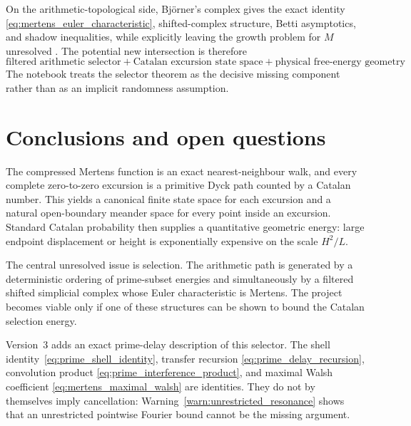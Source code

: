 \documentclass[11pt]{amsart}
\numberwithin{equation}{section}
\theoremstyle{plain}
\theoremstyle{definition}
\theoremstyle{remark}
\newcommand{\Mert}{M}
\begin{document}
On the arithmetic-topological side, Bj\"orner's complex gives the exact identity \eqref{eq:mertens_euler_characteristic}, shifted-complex structure, Betti asymptotics, and shadow inequalities, while explicitly leaving the growth problem for $\Mert$ unresolved \cite{Bjorner2011}.  The potential new intersection is therefore
\begin{equation}
\boxed{
\text{filtered arithmetic selector}
+
\text{Catalan excursion state space}
+
\text{physical free-energy geometry}
}.
\label{eq:literature_intersection}
\end{equation}
The notebook treats the selector theorem as the decisive missing component rather than as an implicit randomness assumption.

\section{Conclusions and open questions}
\label{sec:conclusions}

The compressed Mertens function is an exact nearest-neighbour walk, and every complete zero-to-zero excursion is a primitive Dyck path counted by a Catalan number.  This yields a canonical finite state space for each excursion and a natural open-boundary meander space for every point inside an excursion.  Standard Catalan probability then supplies a quantitative geometric energy: large endpoint displacement or height is exponentially expensive on the scale $H^2/L$.

The central unresolved issue is selection.  The arithmetic path is generated by a deterministic ordering of prime-subset energies and simultaneously by a filtered shifted simplicial complex whose Euler characteristic is Mertens.  The project becomes viable only if one of these structures can be shown to bound the Catalan selection energy.

Version~3 adds an exact prime-delay description of this selector.  The shell
identity~\eqref{eq:prime_shell_identity}, transfer recursion
\eqref{eq:prime_delay_recursion}, convolution product
\eqref{eq:prime_interference_product}, and maximal Walsh coefficient
\eqref{eq:mertens_maximal_walsh} are identities.  They do not by themselves
imply cancellation: Warning~\ref{warn:unrestricted_resonance} shows that an
unrestricted pointwise Fourier bound cannot be the missing argument.
\end{document}
